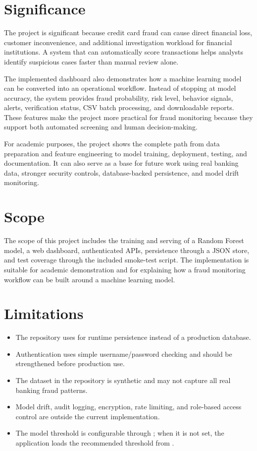 \documentclass[12pt,a4paper]{report}
\begin{document}
\section{Significance}
The project is significant because credit card fraud can cause direct financial loss, customer inconvenience, and additional investigation workload for financial institutions. A system that can automatically score transactions helps analysts identify suspicious cases faster than manual review alone.

The implemented dashboard also demonstrates how a machine learning model can be converted into an operational workflow. Instead of stopping at model accuracy, the system provides fraud probability, risk level, behavior signals, alerts, verification status, CSV batch processing, and downloadable reports. These features make the project more practical for fraud monitoring because they support both automated screening and human decision-making.

For academic purposes, the project shows the complete path from data preparation and feature engineering to model training, deployment, testing, and documentation. It can also serve as a base for future work using real banking data, stronger security controls, database-backed persistence, and model drift monitoring.

\section{Scope}
The scope of this project includes the training and serving of a Random Forest model, a web dashboard, authenticated APIs, persistence through a JSON store, and test coverage through the included smoke-test script. The implementation is suitable for academic demonstration and for explaining how a fraud monitoring workflow can be built around a machine learning model.

\section{Limitations}
\begin{itemize}
    \item The repository uses  for runtime persistence instead of a production database.
    \item Authentication uses simple username/password checking and should be strengthened before production use.
    \item The dataset in the repository is synthetic and may not capture all real banking fraud patterns.
    \item Model drift, audit logging, encryption, rate limiting, and role-based access control are outside the current implementation.
    \item The model threshold is configurable through ; when it is not set, the application loads the recommended threshold from .
\end{itemize}
\end{document}
